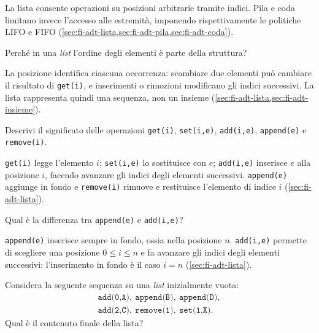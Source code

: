 La lista consente operazioni su posizioni arbitrarie tramite indici. Pila e coda
limitano invece l'accesso alle estremità, imponendo rispettivamente le politiche
LIFO e FIFO (\cref{sec:fi-adt-lista,sec:fi-adt-pila,sec:fi-adt-coda}).

\begin{exercise}
\label{ex:fi-esercizi-strutture-dati-list-ordine}
Perché in una \emph{list} l'ordine degli elementi è parte della struttura?
\end{exercise}

La posizione identifica ciascuna occorrenza: scambiare due elementi può cambiare
il risultato di \texttt{get(i)}, e inserimenti o rimozioni modificano gli indici
successivi. La lista rappresenta quindi una sequenza, non un insieme
(\cref{sec:fi-adt-lista,sec:fi-adt-insieme}).

\begin{exercise}
\label{ex:fi-esercizi-strutture-dati-list-operazioni}
Descrivi il significato delle operazioni \texttt{get(i)}, \texttt{set(i,e)},
\texttt{add(i,e)}, \texttt{append(e)} e \texttt{remove(i)}.
\end{exercise}

\texttt{get(i)} legge l'elemento \(i\); \texttt{set(i,e)} lo sostituisce con
\(e\); \texttt{add(i,e)} inserisce \(e\) alla posizione \(i\), facendo avanzare gli
indici degli elementi successivi. \texttt{append(e)} aggiunge in fondo
e \texttt{remove(i)} rimuove e
restituisce l'elemento di indice \(i\) (\cref{sec:fi-adt-lista}).

\begin{exercise}
\label{ex:fi-esercizi-strutture-dati-list-append-add}
Qual è la differenza tra \texttt{append(e)} e \texttt{add(i,e)}?
\end{exercise}

\texttt{append(e)} inserisce sempre in fondo, ossia nella posizione \(n\).
\texttt{add(i,e)} permette di scegliere una posizione \(0\le i\le n\) e fa
avanzare gli indici degli elementi successivi: l'inserimento in
fondo è il caso \(i=n\)
(\cref{sec:fi-adt-lista}).

\begin{exercise}
\label{ex:fi-esercizi-strutture-dati-list-traccia}
Considera la seguente sequenza su una \emph{list} inizialmente vuota:
\[
\begin{gathered}
  \texttt{add(0,A)},\ \texttt{append(B)},\ \texttt{append(D)},\\
  \texttt{add(2,C)},\ \texttt{remove(1)},\ \texttt{set(1,X)}.
\end{gathered}
\]
Qual è il contenuto finale della lista?
\end{exercise}


